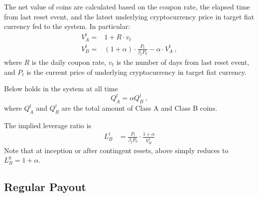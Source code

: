 \documentclass[draft, noinfoline]{ectaart}
\numberwithin{equation}{section}
\theoremstyle{plain}
\begin{document}
\begin{appendices}

The net value of coins are calculated based on the coupon rate, the elapsed time from last reset event, and the latest underlying cryptocurrency price in target fiat currency fed to the system. In particular:
\begin{equation}
\begin{array}{ll}
V_{A}^{t}= & 1+R\cdot v_t\\
V_{B}^{t}= & \left(1+\alpha\right)\cdot\frac{P_{t}}{\beta_tP_{0}}-\alpha\cdot V_{A}^{t}\ ,
\end{array}\label{eq:netvalue-1}
\end{equation}
where $R$ is the daily coupon rate, $v_t$ is the number of days from last reset event, and $P_{t}$ is the current price of underlying cryptocurrency in target fiat currency.


Below holds in the system at all time
\[
Q_{A}^{t}=\alpha Q_{B}^{t}\ ,
\]
where $Q_{A}^{t}$ and $Q_{B}^{t}$ are the total amount of Class A and Class B coins.

The implied leverage ratio is
\begin{align*}
L_{B}^{t} & =\frac{P_{t}}{\beta_tP_{0}}\cdot\frac{1+\alpha}{V_{B}^{t}}
\end{align*}
Note that at inception or after contingent resets, above simply reduces to $L_{B}^{0}=1+\alpha$.

\subsection{Regular Payout}\label{subsec:Periodic-Reset}


\end{appendices}
\end{document}
